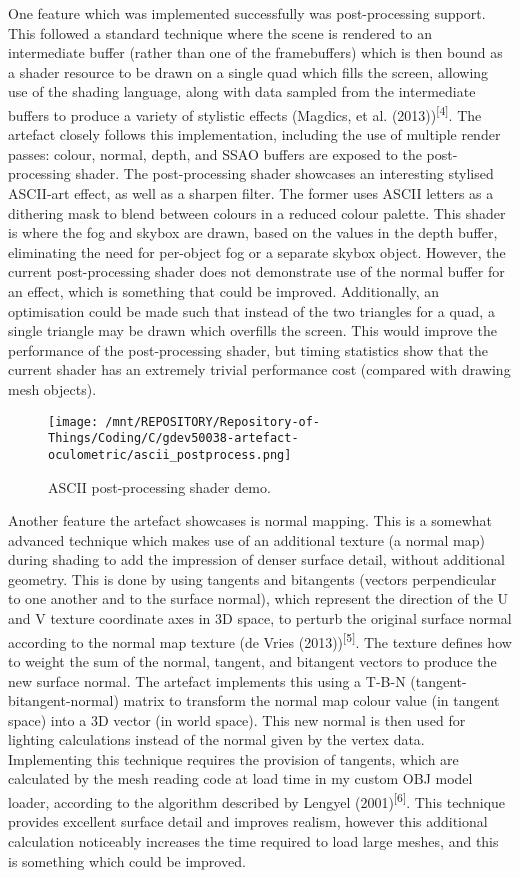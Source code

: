 \documentclass[
]{article}
\begin{document}
{One feature which was implemented successfully was post-processing
support. This followed a standard technique where the scene is rendered
to an intermediate buffer (rather than one of the framebuffers) which is
then bound as a shader resource to be drawn on a single quad which fills
the screen, allowing use of the shading language, along with data
sampled from the intermediate buffers to produce a variety of stylistic
effects (Magdics, et al. (2013))\textsuperscript{{[}4{]}}. The artefact
closely follows this implementation, including the use of multiple
render passes: colour, normal, depth, and SSAO buffers are exposed to
the post-processing shader. The post-processing shader showcases an
interesting stylised ASCII-art effect, as well as a sharpen filter. The former uses ASCII letters as a dithering mask to blend between colours in a reduced colour palette. This shader
is where the fog and skybox are drawn, based on the values in the depth
buffer, eliminating the need for per-object fog or a separate skybox
object. However, the current post-processing shader does not demonstrate
use of the normal buffer for an effect, which is something that could be
improved. Additionally, an optimisation could be made such that instead
of the two triangles for a quad, a single triangle may be drawn which
overfills the screen. This would improve the performance of the
post-processing shader, but timing statistics show that the current
shader has an extremely trivial performance cost (compared with drawing
mesh objects).\\
\begin{figure}[H]
\texttt{[image: /mnt/REPOSITORY/Repository-of-Things/Coding/C/gdev50038-artefact-oculometric/ascii\_postprocess.png]}
\caption{\label{fig:figure1} ASCII post-processing shader demo.}
\end{figure}

Another feature the artefact showcases is normal mapping. This is a
somewhat advanced technique which makes use of an additional texture (a
normal map) during shading to add the impression of denser surface
detail, without additional geometry. This is done by using tangents and
bitangents (vectors perpendicular to one another and to the surface
normal), which represent the direction of the U and V texture coordinate
axes in 3D space, to perturb the original surface normal according to
the normal map texture (de Vries (2013))\textsuperscript{{[}5{]}}. The
texture defines how to weight the sum of the normal, tangent, and
bitangent vectors to produce the new surface normal. The artefact
implements this using a T-B-N (tangent-bitangent-normal) matrix to
transform the normal map colour value (in tangent space) into a 3D
vector (in world space). This new normal is then used for lighting
calculations instead of the normal given by the vertex data.
Implementing this technique requires the provision of tangents, which
are calculated by the mesh reading code at load time in my custom OBJ model loader, according to the
algorithm described by Lengyel (2001)\textsuperscript{{[}6{]}}. This
technique provides excellent surface detail and improves realism,
however this additional calculation noticeably increases the time
required to load large meshes, and this is something which could be improved.

}
\end{document}
